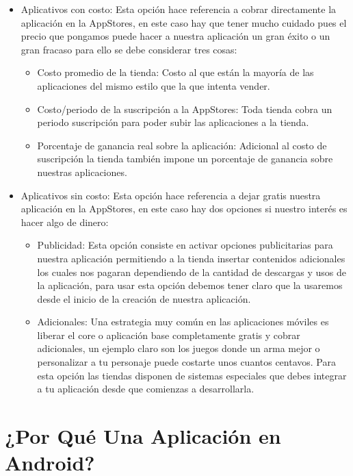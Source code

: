 \documentclass[11pt]{book}
\begin{document}
\begin{itemize}

\item Aplicativos con costo: Esta opción hace referencia a cobrar directamente la aplicación en la \gls{AppStores}, en este caso hay que tener mucho cuidado pues el precio que pongamos puede hacer a nuestra aplicación un gran éxito o un gran fracaso para ello se debe considerar tres cosas:
	\begin{itemize}
	\item Costo promedio de la tienda: Costo al que están la mayoría de las aplicaciones del mismo estilo que la que intenta vender.
	\item Costo/periodo de la suscripción a la \gls{AppStores}: Toda tienda cobra un periodo suscripción para poder subir las aplicaciones a la tienda.
	\item Porcentaje de ganancia real sobre la aplicación: Adicional al costo de suscripción la tienda también impone un porcentaje de ganancia sobre nuestras aplicaciones.
	\end{itemize}
\item Aplicativos sin costo: Esta opción hace referencia a dejar gratis nuestra aplicación en la \gls{AppStores}, en este caso hay dos opciones si nuestro interés es hacer algo de dinero:
	\begin{itemize}
	\item Publicidad: Esta opción consiste en activar opciones publicitarias para nuestra aplicación permitiendo a la tienda insertar contenidos adicionales los cuales nos pagaran dependiendo de la cantidad de descargas y usos de la aplicación, para usar esta opción debemos tener claro que la usaremos desde el inicio de la creación de nuestra aplicación.
	\item Adicionales: Una estrategia muy común en las aplicaciones móviles es liberar el core o aplicación base completamente gratis y cobrar adicionales, un ejemplo claro son los juegos donde un arma mejor o personalizar a tu personaje puede costarte unos cuantos centavos. Para esta opción las tiendas disponen de sistemas especiales que debes integrar a tu aplicación desde que comienzas a desarrollarla.
	\end{itemize}

\end{itemize}

\chapter{¿Por Qué Una Aplicación en Android?}  
\newpage
\end{document}
